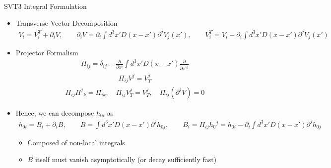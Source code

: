 \documentclass[8pt,aspectratio=1610]{beamer}
\begin{document}
\begin{frame}{SVT3 Integral Formulation}
	\begin{itemize}
		\item Transverse Vector Decomposition
		\begin{eqnarray}
			V_i = V_i^T + \partial_i V, \qquad \partial_i V = \partial_i \int d^3x' D(x-x')\partial^j V_j (x'),\qquad  V_i^T = V_i - \partial_i \int d^3x' D(x-x')\partial^j V_j (x')
		\end{eqnarray}
		\item Projector Formalism
		\begin{eqnarray}
		\Pi_{ij} = \delta_{ij} - \frac{\partial}{\partial x^i}\int d^3x'D(x-x')\frac{\partial}{\partial x'^j}\nonumber
		\end{eqnarray}
		\begin{eqnarray}
		\Pi_{ij}V^j = V_T^j\nonumber
		\end{eqnarray}
		\begin{eqnarray}
		\Pi_{ij}\Pi^j{}_k = \Pi_{ik},\quad \Pi_{ij} V_{T}^j = V^j_{T},\quad \Pi_{ij}(\partial^j V) = 0
		\end{eqnarray}
		\item Hence, we can decompose $h_{0i}$ as
		\begin{eqnarray}
		h_{0i} = B_i + \partial_i B, \qquad B = \int d^3x' D(x-x')\partial^j h_{0j},\qquad B_i = \Pi_{ij}h_{0}{}^j = h_{0i} - \partial_i \int d^3x' D(x-x')\partial^j h_{0j}
		\end{eqnarray}
		\begin{itemize}
			\begingroup
			\normalsize
			\item Composed of non-local integrals
			\item $B$ itself must vanish asymptotically (or decay sufficiently fast)
			\endgroup
		\end{itemize}
	\end{itemize}
\end{frame}

\end{document}
